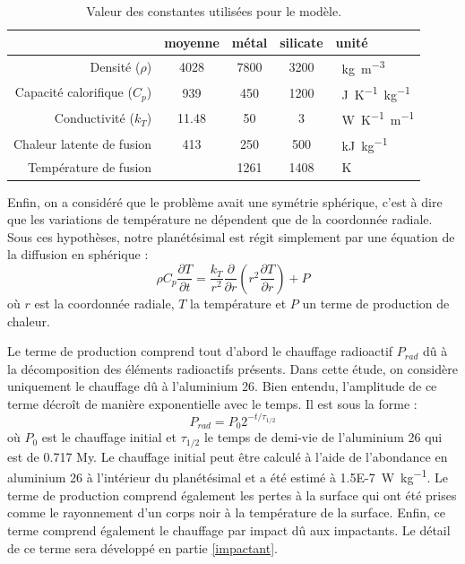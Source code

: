 \documentclass[10pt,a4paper]{article}
\numberwithin{equation}{section}
\begin{document}
\tabulinesep=0.3mm
\begin{table}[h!]
  \center
  \begin{tabu}{ r | c c c l}
     & moyenne & métal & silicate & unité\\ \hline
    Densité ($\rho$) & 4028 & 7800 &  3200 & \SI{}{kg.m^{-3}}\\ \hline
    Capacité calorifique ($C_p$) & 939 & 450 & 1200 &  \SI{}{J.K^{-1}.kg^{-1}} \\ \hline
    Conductivité ($k_T$)& 11.48 & 50 & 3 & \SI{}{W.K^{-1}.m^{-1}}  \\ \hline    
    Chaleur latente de fusion & 413 & 250 & 500 & \SI{}{kJ.kg^{-1}}\\ \hline
    Température de fusion & & 1261 & 1408 & \SI{}{K}\\ \hline
  \end{tabu}
  \caption{Valeur des constantes utilisées pour le modèle.}
  \label{constantes}
\end{table}

Enfin, on a considéré que le problème avait une symétrie sphérique, c'est à dire que les variations de température ne dépendent que de la coordonnée radiale. Sous ces hypothèses, notre planétésimal est régit simplement par une équation de la diffusion en sphérique :
\begin{equation}
\rho C_p \dfrac{\partial T}{\partial t} = \frac{k_{T}}{r^2} \dfrac{\partial }{\partial r}\left( r^2 \dfrac{\partial T}{\partial r} \right) + P
\label{diffusion}
\end{equation}
où $r$ est la coordonnée radiale, $T$ la température et $P$ un terme de production de chaleur.
\medskip

Le terme de production comprend tout d'abord le chauffage radioactif $P_{rad}$ dû à la décomposition des éléments radioactifs présents. Dans cette étude, on considère uniquement le chauffage dû à l'aluminium 26. Bien entendu, l'amplitude de ce terme décroît de manière exponentielle avec le temps. Il est sous la forme :
\begin{equation}
P_{rad} = P_{0}2^{-t/\tau_{1/2}}
\end{equation}
où $P_{0}$ est le chauffage initial et $\tau_{1/2}$ le temps de demi-vie de l'aluminium 26 qui est de 0.717 My. Le chauffage initial peut être calculé à l'aide de l'abondance en aluminium 26 à l'intérieur du planétésimal et a été estimé à \SI{1.5E-7}{W.kg^{-1}}.
Le terme de production comprend également les pertes à la surface qui ont été prises comme le rayonnement d'un corps noir à la température de la surface.
Enfin, ce terme comprend également le chauffage par impact dû aux impactants. Le détail de ce terme sera développé en partie \ref{impactant}.
\medskip
\end{document}
